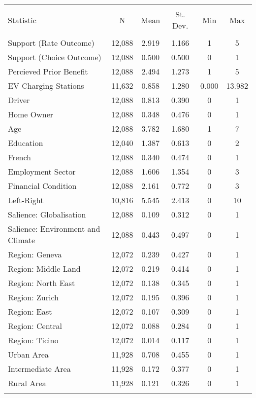 
\begin{table}[!htbp] \centering 
  \caption{} 
  \label{tab:summary_stats} 
\footnotesize 
\begin{tabular}{@{\extracolsep{3pt}}lccccc} 
\\[-1.8ex]\hline 
\hline \\[-1.8ex] 
Statistic & \multicolumn{1}{c}{N} & \multicolumn{1}{c}{Mean} & \multicolumn{1}{c}{St. Dev.} & \multicolumn{1}{c}{Min} & \multicolumn{1}{c}{Max} \\ 
\hline \\[-1.8ex] 
Support (Rate Outcome) & 12,088 & 2.919 & 1.166 & 1 & 5 \\ 
Support (Choice Outcome) & 12,088 & 0.500 & 0.500 & 0 & 1 \\ 
Percieved Prior Benefit & 12,088 & 2.494 & 1.273 & 1 & 5 \\ 
EV Charging Stations & 11,632 & 0.858 & 1.280 & 0.000 & 13.982 \\ 
Driver & 12,088 & 0.813 & 0.390 & 0 & 1 \\ 
Home Owner & 12,088 & 0.348 & 0.476 & 0 & 1 \\ 
Age & 12,088 & 3.782 & 1.680 & 1 & 7 \\ 
Education & 12,040 & 1.387 & 0.613 & 0 & 2 \\ 
French & 12,088 & 0.340 & 0.474 & 0 & 1 \\ 
Employment Sector & 12,088 & 1.606 & 1.354 & 0 & 3 \\ 
Financial Condition & 12,088 & 2.161 & 0.772 & 0 & 3 \\ 
Left-Right & 10,816 & 5.545 & 2.413 & 0 & 10 \\ 
Salience: Globalisation & 12,088 & 0.109 & 0.312 & 0 & 1 \\ 
Salience: Environment and Climate & 12,088 & 0.443 & 0.497 & 0 & 1 \\ 
Region: Geneva & 12,072 & 0.239 & 0.427 & 0 & 1 \\ 
Region: Middle Land & 12,072 & 0.219 & 0.414 & 0 & 1 \\ 
Region: North East & 12,072 & 0.138 & 0.345 & 0 & 1 \\ 
Region: Zurich & 12,072 & 0.195 & 0.396 & 0 & 1 \\ 
Region: East & 12,072 & 0.107 & 0.309 & 0 & 1 \\ 
Region: Central & 12,072 & 0.088 & 0.284 & 0 & 1 \\ 
Region: Ticino & 12,072 & 0.014 & 0.117 & 0 & 1 \\ 
Urban Area & 11,928 & 0.708 & 0.455 & 0 & 1 \\ 
Intermediate Area & 11,928 & 0.172 & 0.377 & 0 & 1 \\ 
Rural Area & 11,928 & 0.121 & 0.326 & 0 & 1 \\ 
\hline \\[-1.8ex] 
\end{tabular} 
\end{table} 
